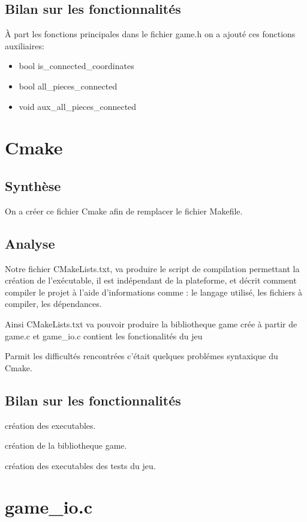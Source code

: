 \documentclass[12pt]{article}
\begin{document}
\subsection{Bilan sur les fonctionnalités}
\`A part les fonctions principales dans le fichier game.h on a ajouté ces fonctions auxiliaires:

\begin{itemize}
\item bool is\_connected\_coordinates

\item bool all\_pieces\_connected

\item void aux\_all\_pieces\_connected
\end{itemize}


\section{Cmake}
\subsection{Synthèse}
On a créer ce fichier Cmake afin de remplacer le fichier Makefile.
\subsection{Analyse}
Notre fichier CMakeLists.txt, va produire le script de compilation permettant la création de l'exécutable,
il est indépendant de la plateforme, et décrit comment compiler le projet à l'aide d'informations comme : le langage utilisé, les fichiers à compiler, les dépendances.

Ainsi CMakeLists.txt va pouvoir produire la bibliotheque game crée à partir de game.c et game\_io.c contient les fonctionalités du jeu

Parmit les difficultés rencontrées c'était quelques problémes syntaxique du Cmake.
\subsection{Bilan sur les fonctionnalités}
création des executables.
 
création de la bibliotheque game.
 
création des executables des tests du jeu.



\section{game\_io.c}
\end{document}
